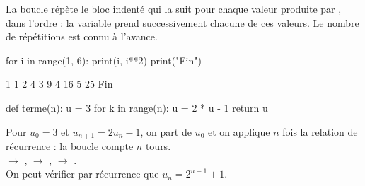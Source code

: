 
\begin{definition}
La boucle  répète le bloc indenté qui la suit pour chaque valeur produite par , dans l'ordre :
la variable  prend successivement chacune de ces valeurs. Le nombre de répétitions est connu à l'avance.
\end{definition}

\begin{codecote}[0.5]
\begin{pythoncol}
for i in range(1, 6):
    print(i, i**2)
print("Fin")
\end{pythoncol}
\cote
\begin{consolecol}
1 1
2 4
3 9
4 16
5 25
Fin
\end{consolecol}
\end{codecote}

\begin{savoirfaire}
\begin{codecote}[0.42]
\begin{pythoncol}
def terme(n):
    u = 3
    for k in range(n):
        u = 2 * u - 1
    return u
\end{pythoncol}
\cote
Pour $u_0=3$ et $u_{n+1}=2u_n-1$, on part de $u_0$ et on applique $n$ fois la relation de récurrence : la boucle compte $n$ tours.\\[1mm]
 $\to$ ,\enspace {} $\to$ ,\enspace {} $\to$ .\\[1mm]
On peut vérifier par récurrence que $u_n=2^{n+1}+1$.
\end{codecote}
\end{savoirfaire}


